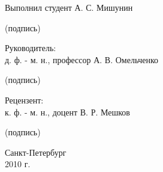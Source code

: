 \begin{titlepage}
{	\vspace{20pt}
	\begin{flushleft}
		{ Выполнил студент \hfill А. С. Мишунин} \\
		\begin{center} { \fontsize{8pt}{0pt} (подпись) } \end{center}
		{ Руководитель:\\д. ф. - м. н., профессор \hfill А. В. Омельченко} \\
		\begin{center} { \fontsize{8pt}{0pt} (подпись) } \end{center}
		{ Рецензент:\\к. ф. - м. н., доцент \hfill В. Р. Мешков}
		\begin{center} { \fontsize{8pt}{0pt} (подпись) } \end{center}
	\end{flushleft}

	\vfill
	\begin{center}
	{
		Санкт-Петербург \\[5pt]
		2010 г.
	}
	\end{center}
}
\end{titlepage}
